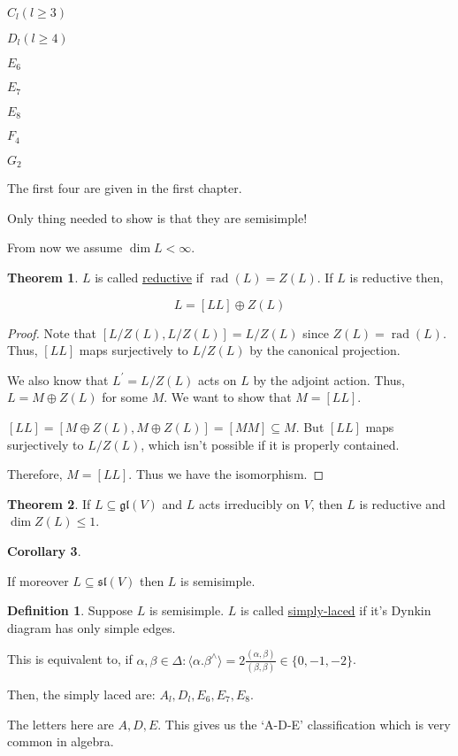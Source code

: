 \documentclass{article}
\theoremstyle{definition}
\newtheorem*{definition}{Definition}
\newtheorem{theorem}{Theorem}
\newtheorem{corollary}[theorem]{Corollary}
\begin{document}
    \(C_l (l\geq 3)\)
    
    \(D_l(l \geq 4)\)
    
    \(E_6\)
    
    \(E_7\)
    
    \(E_8\)

    \(F_4\)
    
    \(G_2\) 

    The first four are given in the first chapter.

    Only thing needed to show is that they are semisimple!

    From now we assume \(\dim L < \infty\).

    \begin{theorem}
        \(L\) is called \underline{reductive} if \(\operatorname{rad}(L) = Z(L)\). If \(L\) is reductive then,

        \[
            L = [LL] \oplus Z(L)
        \]

    \end{theorem}

    \begin{proof}
        Note that \([L / Z(L), L / Z(L)] = L / Z(L)\) since \(Z(L) = \operatorname{rad}(L)\). Thus, \([LL]\) maps surjectively to \(L / Z(L)\) by the canonical projection.

        We also know that \(L^{\prime} = L / Z(L)\) acts on \(L\) by the adjoint action. Thus, \(L = M \oplus Z(L)\) for some \(M\). We want to show that \(M = [LL]\).

        \([LL] = [M \oplus Z(L), M \oplus Z(L)] = [MM] \subseteq M\). But \([LL]\) maps surjectively to \(L / Z(L)\), which isn't possible if it is properly contained.

        Therefore, \(M = [LL]\). Thus we have the isomorphism.
    \end{proof}

    \begin{theorem}
        If \(L \subseteq \mathfrak{gl}(V)\) and \(L\) acts irreducibly on \(V\), then \(L\) is reductive and \(\dim Z(L) \leq 1\).        
    \end{theorem}

    \begin{corollary}
        
    \end{corollary}If moreover \(L \subseteq \mathfrak{sl}(V)\) then \(L\) is semisimple.

    \begin{definition}
        Suppose \(L\) is semisimple. \(L\) is called \underline{simply-laced} if it's Dynkin diagram has only simple edges.

        This is equivalent to, if \(\alpha, \beta \in \Delta : \langle \alpha. \beta^\wedge \rangle = 2 \frac{(\alpha, \beta)}{(\beta, \beta)} \in \{ 0,-1,-2 \}\).

        Then, the simply laced are: \(A_l, D_l, E_6, E_7, E_8\).

        The letters here are \(A, D, E\). This gives us the `A-D-E' classification which is very common in algebra.

        
        
    \end{definition}
\end{document}
